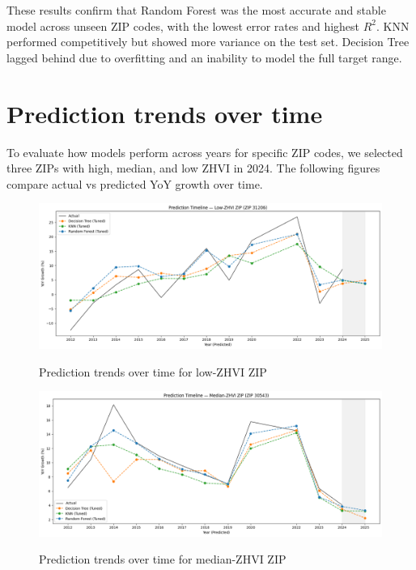 These results confirm that Random Forest was the most accurate and stable model across unseen ZIP codes, with the lowest error rates and highest $R^2$. KNN performed competitively but showed more variance on the test set. Decision Tree lagged behind due to overfitting and an inability to model the full target range.

\section{Prediction trends over time}

To evaluate how models perform across years for specific ZIP codes, we selected three ZIPs with high, median, and low ZHVI in 2024. The following figures compare actual vs predicted YoY growth over time.

\begin{figure}[!ht]
    \centering
    \includegraphics[width=\textwidth]{figures/timelineLow.png}
    \caption{Prediction trends over time for low-ZHVI ZIP}
    \caption*{\hspace{1em}}
    \label{fig:timeline_low}
\end{figure}
\FloatBarrier

\begin{figure}[!ht]
    \centering
    \includegraphics[width=\textwidth]{figures/timelineMedian.png}
    \caption{Prediction trends over time for median-ZHVI ZIP}
    \caption*{\hspace{1em}}
    \label{fig:timeline_median}
\end{figure}
\FloatBarrier

